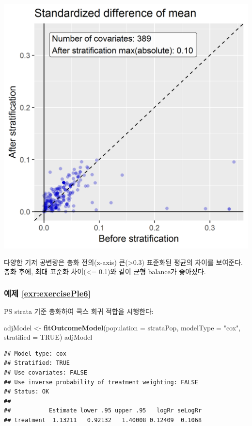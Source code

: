 \documentclass[10.5pt]{book}
\newenvironment{Shaded}{\begin{snugshade}}{\end{snugshade}}
\newcommand{\KeywordTok}[1]{\textcolor[rgb]{0.13,0.29,0.53}{\textbf{#1}}}
\newcommand{\DataTypeTok}[1]{\textcolor[rgb]{0.13,0.29,0.53}{#1}}
\newcommand{\StringTok}[1]{\textcolor[rgb]{0.31,0.60,0.02}{#1}}
\newcommand{\OtherTok}[1]{\textcolor[rgb]{0.56,0.35,0.01}{#1}}
\newcommand{\NormalTok}[1]{#1}
\theoremstyle{definition}
\theoremstyle{definition}
\theoremstyle{definition}
\theoremstyle{remark}
\begin{document}
\begin{center}\includegraphics[width=0.7\linewidth]{images/SuggestedAnswers/scatter} \end{center}

다양한 기저 공변량은 층화 전의(x-axis) 큰(\textgreater{}0.3) 표준화된
평균의 차이를 보여준다. 층화 후에, 최대 표준화 차이(\textless{}= 0.1)와
같이 균형 balance가 좋아졌다.

\subsubsection*{예제 \ref{exr:exercisePle6}}\label{-refexrexerciseple6}

PS strata 기준 층화하여 콕스 회귀 적합을 시행한다:

\begin{Shaded}
\begin{Highlighting}[]
\NormalTok{adjModel <-}\StringTok{ }\KeywordTok{fitOutcomeModel}\NormalTok{(}\DataTypeTok{population =}\NormalTok{ strataPop,}
                         \DataTypeTok{modelType =} \StringTok{"cox"}\NormalTok{,}
                         \DataTypeTok{stratified =} \OtherTok{TRUE}\NormalTok{)}
\NormalTok{adjModel}
\end{Highlighting}
\end{Shaded}

\begin{verbatim}
## Model type: cox
## Stratified: TRUE
## Use covariates: FALSE
## Use inverse probability of treatment weighting: FALSE
## Status: OK
## 
##           Estimate lower .95 upper .95   logRr seLogRr
## treatment  1.13211   0.92132   1.40008 0.12409  0.1068
\end{verbatim}
\end{document}
